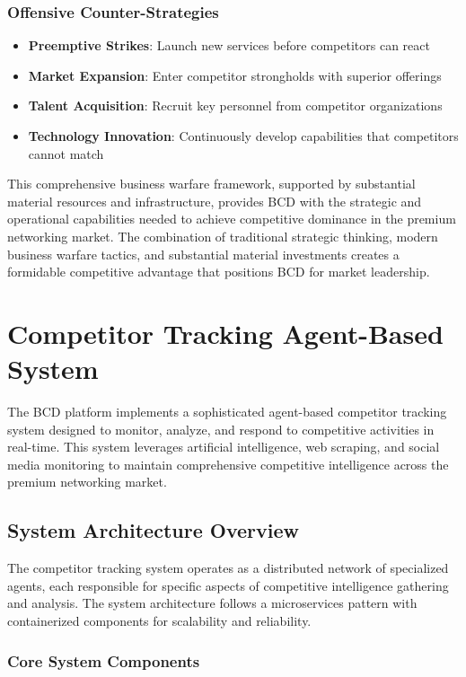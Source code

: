 \subsubsection{Offensive Counter-Strategies}
\begin{itemize}
    \item \textbf{Preemptive Strikes}: Launch new services before competitors can react
    \item \textbf{Market Expansion}: Enter competitor strongholds with superior offerings
    \item \textbf{Talent Acquisition}: Recruit key personnel from competitor organizations
    \item \textbf{Technology Innovation}: Continuously develop capabilities that competitors cannot match
\end{itemize}

This comprehensive business warfare framework, supported by substantial material resources and infrastructure, provides BCD with the strategic and operational capabilities needed to achieve competitive dominance in the premium networking market. The combination of traditional strategic thinking, modern business warfare tactics, and substantial material investments creates a formidable competitive advantage that positions BCD for market leadership.

\section{Competitor Tracking Agent-Based System}

The BCD platform implements a sophisticated agent-based competitor tracking system designed to monitor, analyze, and respond to competitive activities in real-time. This system leverages artificial intelligence, web scraping, and social media monitoring to maintain comprehensive competitive intelligence across the premium networking market.

\subsection{System Architecture Overview}

The competitor tracking system operates as a distributed network of specialized agents, each responsible for specific aspects of competitive intelligence gathering and analysis. The system architecture follows a microservices pattern with containerized components for scalability and reliability.

\subsubsection{Core System Components}

